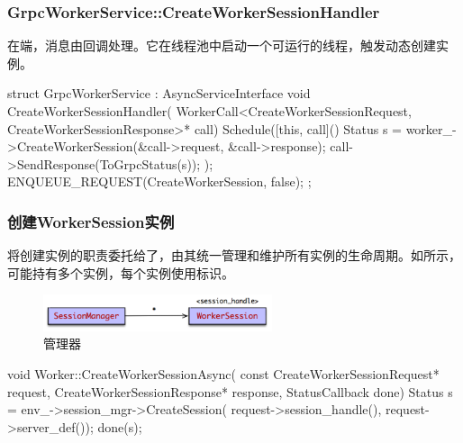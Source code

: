 \begin{content}
\subsubsection{GrpcWorkerService::CreateWorkerSessionHandler}

在端，消息由回调处理。它在线程池中启动一个可运行的线程，触发动态创建实例。

\begin{leftbar}
\begin{c++}
struct GrpcWorkerService : AsyncServiceInterface {
  void CreateWorkerSessionHandler(
      WorkerCall<CreateWorkerSessionRequest, CreateWorkerSessionResponse>*
          call) {
    Schedule([this, call]() {
      Status s = worker_->CreateWorkerSession(&call->request, &call->response);
      call->SendResponse(ToGrpcStatus(s));
    });
    ENQUEUE_REQUEST(CreateWorkerSession, false);
  }
};
\end{c++}
\end{leftbar}

\subsubsection{创建WorkerSession实例}

将创建实例的职责委托给了，由其统一管理和维护所有实例的生命周期。如所示，可能持有多个实例，每个实例使用标识。

\begin{figure}[H]
\centering
\includegraphics[width=0.6\textwidth]{figures/dist-worker-session-manager.png}
\caption{管理器}
 \label{fig:dist-worker-session-manager}
\end{figure}

\begin{leftbar}
\begin{c++}
void Worker::CreateWorkerSessionAsync(
    const CreateWorkerSessionRequest* request,
    CreateWorkerSessionResponse* response,
    StatusCallback done) {
  Status s = env_->session_mgr->CreateSession(
      request->session_handle(),
      request->server_def());
  done(s);
}
\end{c++}
\end{leftbar}


\end{content}
